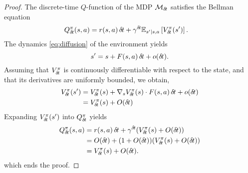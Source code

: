 \begin{proof}
The discrete-time $Q$-function of the MDP $\mathcal{M}_{\delta\hspace{-.1em}t}$ satisfies the Bellman equation
  \begin{align}
    Q^\pi_{\delta\hspace{-.1em}t}(s, a) &= r(s, a)\,{\delta\hspace{-.1em}t} + \gamma^{\delta\hspace{-.1em}t} \mathbb{E}_{s'|s,
    a}\left[V^\pi_{\delta\hspace{-.1em}t}(s')\right] .
  \end{align}
The dynamics \eqref{eq:diffusion} of the environment yields
  \begin{equation}
  s' = s + F(s, a) \,{\delta\hspace{-.1em}t} + o({\delta\hspace{-.1em}t}).
  \end{equation}
  Assuming that $V^\pi_{\delta\hspace{-.1em}t}$ is continuously differentiable with
  respect to the state, and that its derivatives are uniformly bounded, we
  obtain,
  \begin{align}
  V^\pi_{\delta\hspace{-.1em}t}(s') &= V^\pi_{\delta\hspace{-.1em}t}(s) + \nabla_s V^\pi_{\delta\hspace{-.1em}t}(s)\cdot
  F(s, a)\,{\delta\hspace{-.1em}t} + o({\delta\hspace{-.1em}t})\\
		    &= V^\pi_{\delta\hspace{-.1em}t}(s) + O({\delta\hspace{-.1em}t})
  \end{align}
  Expanding $V^\pi_{\delta\hspace{-.1em}t}(s')$ into $Q^\pi_{\delta\hspace{-.1em}t}$ yields
  \begin{align}
  Q^\pi_{\delta\hspace{-.1em}t}(s, a) &= r(s, a)\,{\delta\hspace{-.1em}t} + \gamma^{\delta\hspace{-.1em}t} (V^\pi_{\delta\hspace{-.1em}t}(s) + O({\delta\hspace{-.1em}t}))\\
		      &= O({\delta\hspace{-.1em}t})+(1 + O({\delta\hspace{-.1em}t})) (V^\pi_{\delta\hspace{-.1em}t}(s) + O({\delta\hspace{-.1em}t})) \\
		      &= V^\pi_{\delta\hspace{-.1em}t}(s) + O({\delta\hspace{-.1em}t}).
  \end{align}
which ends the proof.
  \end{proof}


